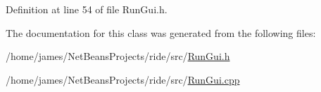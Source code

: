 Definition at line 54 of file Run\-Gui.\-h.



The documentation for this class was generated from the following files\-:\begin{DoxyCompactItemize}
\item 
/home/james/\-Net\-Beans\-Projects/ride/src/\hyperlink{_run_gui_8h}{Run\-Gui.\-h}\item 
/home/james/\-Net\-Beans\-Projects/ride/src/\hyperlink{_run_gui_8cpp}{Run\-Gui.\-cpp}\end{DoxyCompactItemize}
